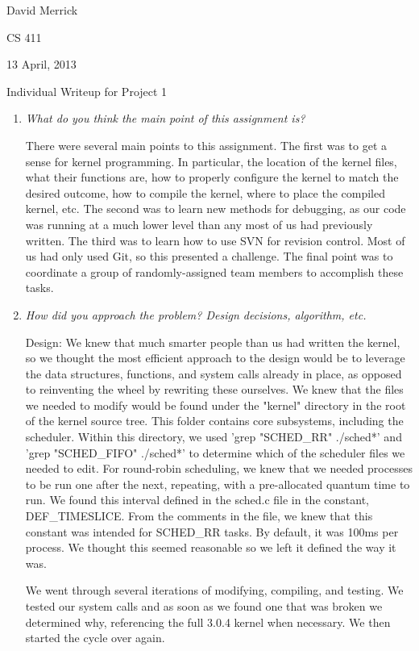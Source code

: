 \documentclass[letterpaper,10pt,titlepage]{article}
\newcommand{\tab}{\hspace*{2em}} %
\begin{document}
David Merrick

CS 411

13 April, 2013

\begin{center}
{\LARGE Individual Writeup for Project 1}
\end{center}

\begin{enumerate} 
\item \emph{What do you think the main point of this assignment is?}

\tab There were several main points to this assignment. The first was to get a sense for kernel programming. In particular, the location of the kernel files, what their functions are, how to properly configure the kernel to match the desired outcome, how to compile the kernel, where to place the compiled kernel, etc. The second was to learn new methods for debugging, as our code was running at a much lower level than any most of us had previously written. The third was to learn how to use SVN for revision control. Most of us had only used Git, so this presented a challenge. The final point was to coordinate a group of randomly-assigned team members to accomplish these tasks.

\item \emph{How did you approach the problem? Design decisions, algorithm, etc.}

\tab Design: We knew that much smarter people than us had written the kernel, so we thought the most efficient approach to the design would be to leverage the data structures, functions, and system calls already in place, as opposed to reinventing the wheel by rewriting these ourselves. We knew that the files we needed to modify would be found under the "kernel" directory in the root of the kernel source tree. This folder contains core subsystems, including the scheduler. Within this directory, we used 'grep "SCHED_RR" ./sched*' and 'grep "SCHED_FIFO" ./sched*' to determine which of the scheduler files we needed to edit. For round-robin scheduling, we knew that we needed processes to be run one after the next, repeating, with a pre-allocated quantum time to run. We found this interval defined in the sched.c file in the constant, DEF_TIMESLICE. From the comments in the file, we knew that this constant was intended for SCHED_RR tasks. By default, it was 100ms per process. We thought this seemed reasonable so we left it defined the way it was. 

We went through several iterations of modifying, compiling, and testing. We tested our system calls and as soon as we found one that was broken we determined why, referencing the full 3.0.4 kernel when necessary. We then started the cycle over again.


\end{enumerate}
\end{document}
